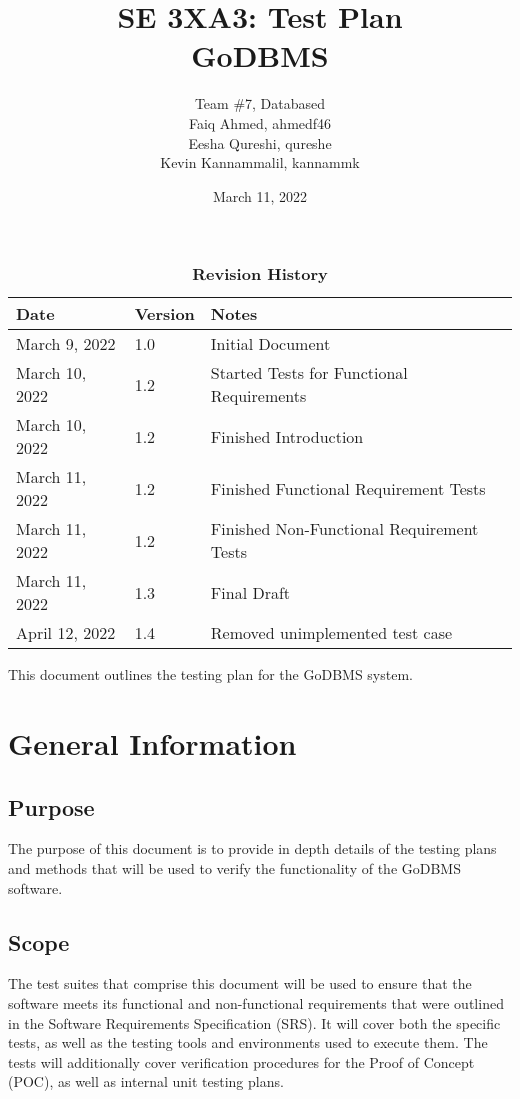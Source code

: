 \documentclass[12pt, titlepage]{article}
\title{SE 3XA3: Test Plan\\GoDBMS}
\author{Team \#7, Databased
		\\ Faiq Ahmed, ahmedf46
		\\ Eesha Qureshi, qureshe
		\\ Kevin Kannammalil, kannammk
}
\date{March 11, 2022}
\begin{document}
\maketitle

\tableofcontents
\listoftables
\listoffigures

\begin{table}[H]
\caption{\bf Revision History}
\begin{tabularx}{\textwidth}{p{3cm}p{2cm}X}
\toprule {\bf Date} & {\bf Version} & {\bf Notes}\\
\midrule
March 9, 2022 & 1.0 & Initial Document \\
March 10, 2022 & 1.2 & Started Tests for Functional Requirements \\
March 10, 2022 & 1.2 & Finished Introduction \\
March 11, 2022 & 1.2 & Finished Functional Requirement Tests \\
March 11, 2022 & 1.2 & Finished Non-Functional Requirement Tests \\
March 11, 2022 & 1.3 & Final Draft \\
{\color{red}April 12, 2022} & {\color{red}1.4} & {\color{red} Removed unimplemented test case} \\
\bottomrule
\end{tabularx}
\end{table}

\newpage


This document outlines the testing plan for the GoDBMS system.

\section{General Information}

\subsection{Purpose}
The purpose of this document is to provide in depth details of the testing plans and methods that will be used to verify the functionality of the GoDBMS software.

\subsection{Scope}
The test suites that comprise this document will be used to ensure that the software meets its functional and non-functional requirements that were outlined in the Software Requirements Specification (SRS). It will cover both the specific tests, as well as the testing tools and environments used to execute them. The tests will additionally cover verification procedures for the Proof of Concept (POC), as well as internal unit testing plans.
\end{document}
